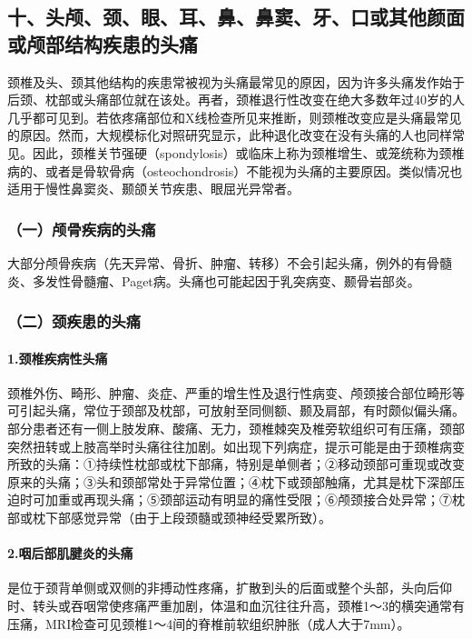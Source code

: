 \subsection{十、头颅、颈、眼、耳、鼻、鼻窦、牙、口或其他颜面或颅部结构疾患的头痛}

颈椎及头、颈其他结构的疾患常被视为头痛最常见的原因，因为许多头痛发作始于后颈、枕部或头痛部位就在该处。再者，颈椎退行性改变在绝大多数年过40岁的人几乎都可见到。若依疼痛部位和X线检查所见来推断，则颈椎改变应是头痛最常见的原因。然而，大规模标化对照研究显示，此种退化改变在没有头痛的人也同样常见。因此，颈椎关节强硬（spondylosis）或临床上称为颈椎增生、或笼统称为颈椎病的、或者是骨软骨病（osteochondrosis）不能视为头痛的主要原因。类似情况也适用于慢性鼻窦炎、颞颌关节疾患、眼屈光异常者。

\subsubsection{（一）颅骨疾病的头痛}

大部分颅骨疾病（先天异常、骨折、肿瘤、转移）不会引起头痛，例外的有骨髓炎、多发性骨髓瘤、Paget病。头痛也可能起因于乳突病变、颞骨岩部炎。

\subsubsection{（二）颈疾患的头痛}

\paragraph{1.颈椎疾病性头痛}

颈椎外伤、畸形、肿瘤、炎症、严重的增生性及退行性病变、颅颈接合部位畸形等可引起头痛，常位于颈部及枕部，可放射至同侧额、颞及肩部，有时颇似偏头痛。部分患者还有一侧上肢发麻、酸痛、无力，颈椎棘突及椎旁软组织可有压痛，颈部突然扭转或上肢高举时头痛往往加剧。如出现下列病症，提示可能是由于颈椎病变所致的头痛：①持续性枕部或枕下部痛，特别是单侧者；②移动颈部可重现或改变原来的头痛；③头和颈部常处于异常位置；④枕下或颈部触痛，尤其是枕下深部压迫时可加重或再现头痛；⑤颈部运动有明显的痛性受限；⑥颅颈接合处异常；⑦枕部或枕下部感觉异常（由于上段颈髓或颈神经受累所致）。

\paragraph{2.咽后部肌腱炎的头痛}

是位于颈背单侧或双侧的非搏动性疼痛，扩散到头的后面或整个头部，头向后仰时、转头或吞咽常使疼痛严重加剧，体温和血沉往往升高，颈椎1～3的横突通常有压痛，MRI检查可见颈椎1～4间的脊椎前软组织肿胀（成人大于7mm）。

